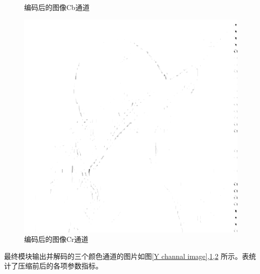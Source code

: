 \documentclass{article}
\numberwithin {equation}{section}
\begin{document}
\begin{spacing}{1.25}
\begin{figure}[H]
    \caption{编码后的图像Cb通道}
    \label{Cb channal image}
  \end{figure}
  \begin{figure}[H]
    \centering
    \includegraphics[scale=0.4]{../src/test/Cr_channal.jpg}
    \caption{编码后的图像Cr通道}
    \label{Cr channal image}
  \end{figure}

  最终模块输出并解码的三个颜色通道的图片如图\ref{Y channal image},\ref{Cb channal image},\ref{Cr channal image}
  所示。表统计了压缩前后的各项参数指标。


\end{spacing}
\end{document}

